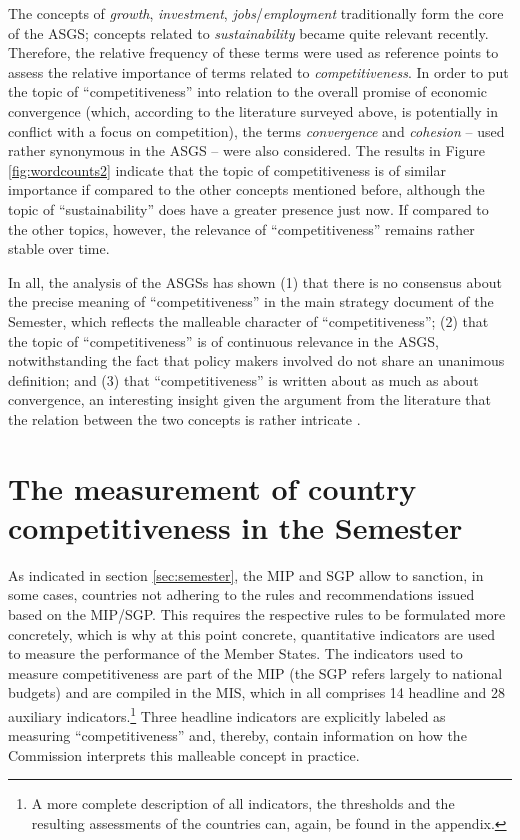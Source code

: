 \documentclass[
]{article}
\begin{document}
The concepts of \emph{growth}, \emph{investment}, \emph{jobs}/\emph{employment} traditionally form
the core of the ASGS; concepts related to \emph{sustainability} became quite relevant
recently. Therefore, the relative frequency of these terms were used as reference
points to assess the relative importance of terms related to \emph{competitiveness}.
In order to put the topic of \enquote{competitiveness} into relation to the overall promise of
economic convergence (which, according to the literature surveyed above, is
potentially in conflict with a focus on competition), the terms \emph{convergence}
and \emph{cohesion} -- used rather synonymous in the ASGS -- were also considered.
The results in Figure \ref{fig:wordcounts2} indicate that the topic
of competitiveness is of similar importance if compared to the other concepts
mentioned before,
although the topic of \enquote{sustainability} does have a greater presence just now.
If compared to the other topics, however, the relevance of \enquote{competitiveness}
remains rather stable over time.

In all, the analysis of the ASGSs has shown (1) that there is no consensus
about the precise meaning of \enquote{competitiveness} in the main strategy document of
the Semester, which reflects the malleable character of \enquote{competitiveness};
(2) that the topic
of \enquote{competitiveness} is of continuous relevance in the ASGS, notwithstanding the
fact that policy makers involved do not share an unanimous definition; and (3)
that \enquote{competitiveness} is written about as much as about convergence, an interesting
insight given the argument from the literature that the relation between the
two concepts is rather intricate
\citep[e.g.][see also Section \ref{subsec:polar}]{Kapeller:2019cds}.

\FloatBarrier

\hypertarget{sec:competIndicators}{%
\section{The measurement of country competitiveness in the Semester}\label{sec:competIndicators}}

As indicated in section \ref{sec:semester}, the MIP and SGP allow to sanction,
in some cases, countries not adhering to the rules and recommendations issued
based on the MIP/SGP. This requires the respective rules to be
formulated more concretely, which is why at this point concrete, quantitative
indicators are used to measure the performance of the Member States.
The indicators used to measure competitiveness are part of the MIP
(the SGP refers largely to national budgets) and
are compiled in the MIS, which in all comprises 14 headline and 28 auxiliary
indicators.\footnote{A more complete
  description of all indicators, the thresholds and the resulting assessments of
  the countries can, again, be found in the appendix.}
Three headline indicators are explicitly labeled as measuring \enquote{competitiveness}
\citep[]{EuropeanCommission:StaffMIP} and, thereby, contain
information on how the Commission interprets this malleable concept in practice.
\end{document}

